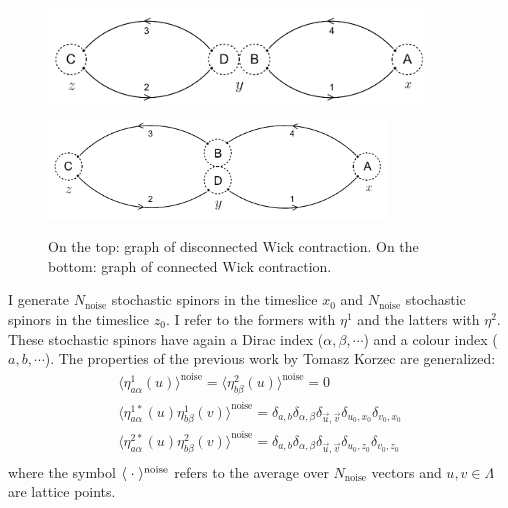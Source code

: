 \documentclass[11pt,a4paper]{article}
\begin{document}
\begin{figure}[h!]
    \centering
    \includegraphics[width=0.9\textwidth]{include-imgs/Wick_disconnected.png}
    \includegraphics[width=0.8\textwidth]{include-imgs/Wick_connected.png}
    \caption{On the top: graph of disconnected Wick contraction. On the bottom: graph of connected Wick contraction.}
\end{figure}\label{figura_fig}
\newline
I generate $N_{\text{noise}}$ stochastic spinors in the timeslice $x_0$ and $N_{\text{noise}}$ stochastic spinors in the timeslice $z_0$.
I refer to the formers with $\eta^{1}$ and the latters with $\eta^{2}$.
These stochastic spinors have again a Dirac index ($\alpha,\beta,\cdots$) and a colour index ($a,b,\cdots$).
The properties of the previous work by Tomasz Korzec are generalized:
\begin{equation}
    \begin{gathered}
        \langle \eta^{1}_{a\alpha} (u) \rangle^{\text{noise}} = \langle \eta^{2}_{b\beta} (u) \rangle^{\text{noise}} = 0 \\
        \langle \eta^{1*}_{a\alpha} (u) \eta^{1}_{b\beta} (v) \rangle^{\text{noise}} = \delta_{a,b} \delta_{\alpha,\beta} \delta_{\vec u, \vec v} \delta_{u_0,x_0} \delta_{v_0,x_0} \\
        \langle \eta^{2*}_{a\alpha} (u) \eta^{2}_{b\beta} (v) \rangle^{\text{noise}} = \delta_{a,b} \delta_{\alpha,\beta} \delta_{\vec u, \vec v} \delta_{u_0,z_0} \delta_{v_0,z_0} \\
    \end{gathered}
\end{equation}
where the symbol $\langle\hspace{1mm}\cdot\hspace{1mm}\rangle^\text{noise}$ refers to the average over $N_{\text{noise}}$ vectors and $u,v \in \Lambda$ are lattice points.
\end{document}
